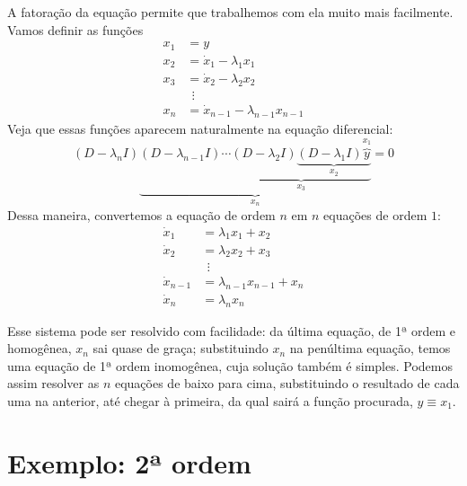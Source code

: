 \documentclass[12pt,a4paper,oneside]{memoir}
\begin{document}
A fatoração da equação permite que trabalhemos com ela muito mais facilmente.  Vamos definir as funções
\begin{equation}
  \begin{aligned}
    x_1 &= y \\
    x_2 &= \dot{x}_1 - \lambda_1 x_1 \\
    x_3 &= \dot{x}_2 - \lambda_2 x_2 \\
    &\ \:\vdots \\
    x_{n} &= \dot{x}_{n-1} - \lambda_{n-1} x_{n-1}
  \end{aligned}
\end{equation}
Veja que essas funções aparecem naturalmente na equação diferencial:
\[
  (D - \lambda_n I)
  \underbrace{(D - \lambda_{n-1} I) \cdots
    \underbrace{(D - \lambda_2 I)
      \underbrace{(D - \lambda_1 I)
        \overbrace{y}^{x_1}
      }_{x_2}
    }_{x_3}
  }_{x_n} = 0
\]
Dessa maneira, convertemos a equação de ordem $n$ em $n$ equações de ordem $1$:
\begin{equation}
\label{edon-sist-jor}
  \begin{aligned}
    \dot{x}_1 &= \lambda_1 x_1 + x_2 \\
    \dot{x}_2 &= \lambda_2 x_2 + x_3 \\
    &\ \:\vdots \\
    \dot{x}_{n-1} &= \lambda_{n-1} x_{n-1} + x_n \\
    \dot{x}_{n} &= \lambda_n x_n
  \end{aligned}
\end{equation}

Esse sistema pode ser resolvido com facilidade: da última equação, de 1ª ordem e homogênea, $x_n$ sai quase de graça; substituindo $x_n$ na penúltima equação, temos uma equação de 1ª ordem inomogênea, cuja solução também é simples.  Podemos assim resolver as $n$ equações de baixo para cima, substituindo o resultado de cada uma na anterior, até chegar à primeira, da qual sairá a função procurada, $y \equiv x_1$.

\section{Exemplo: 2ª ordem}
\end{document}
